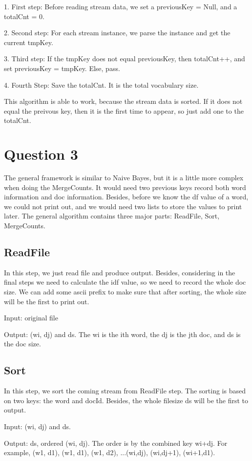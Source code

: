 \documentclass{article} %
\begin{document}
1. First step: Before reading  stream data, we set a previousKey =
Null, and a totalCnt = 0.

2. Second step: For each stream instance, we parse the instance and get the current
tmpKey.

3. Third step: If the tmpKey does not equal previousKey, then totalCnt++, and set
previousKey = tmpKey. Else, pass.

4. Fourth Step: Save the totalCnt. It is the total vocabulary size.

This algorithm is able to work, because the stream data is sorted. If
it does not equal the preivous key, then it is the first time to appear,
so just add one to the totalCnt.


\section{Question 3}
The general framework is similar to Naive Bayes, but it is a little more complex
when doing the MergeCounts. It would need two previous keys record both word
information and doc information. Besides, before we know the df value of a word,
we could not print out, and we would need two lists to store the values to print
later. The general algorithm contains three major parts: ReadFile, Sort,
MergeCounts.


\subsection{ReadFile}
In this step, we just read file and produce output. Besides, considering in the
final steps we need to calculate the idf value, so we need to record the whole
doc size. We can add some ascii prefix to make sure that after sorting, the
whole size will be the first to print out.

Input: original file

Output: (wi, dj) and ds. The wi is the ith word, the dj is the jth doc, and ds
is the doc size.

\subsection{Sort}
In this step, we sort the coming stream from ReadFile step. The sorting is based
on two keys: the word and docId. Besides, the whole filesize ds will be the
first to output.

Input: (wi, dj) and ds.

Output: ds, ordered (wi, dj). The order is by the combined key wi+dj. For
example, (w1, d1), (w1, d1), (w1, d2), ...(wi,dj), (wi,dj+1), (wi+1,d1).
\end{document}
